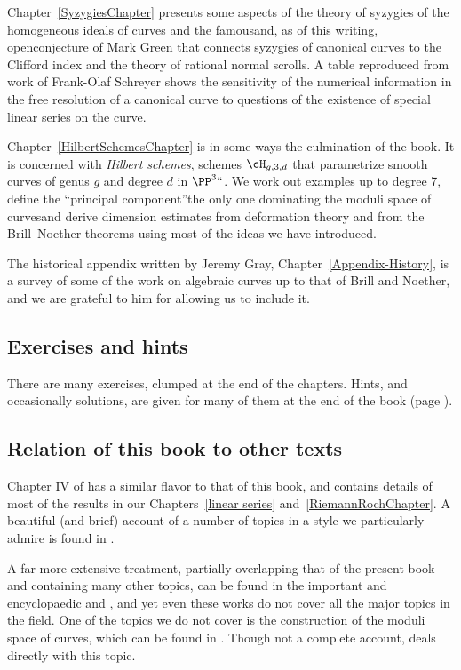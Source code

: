 Chapter~\ref{SyzygiesChapter} presents some aspects of the theory of syzygies of the homogeneous ideals of curves and the famous\emdash and, as of this writing, open\emdash conjecture of Mark Green that connects syzygies of canonical curves to the Clifford index and the theory of rational normal scrolls. A table reproduced from work of Frank-Olaf Schreyer shows the sensitivity of the numerical information in the free resolution of a canonical curve to questions of the existence of special linear series on the curve.

Chapter~\ref{HilbertSchemesChapter} is in some ways the culmination of
the book. It is concerned with \emph{Hilbert schemes}, schemes
$\cH_{g,3,d}$ that parametrize smooth curves of genus $g$ and degree
$d$  in $\PP^3` `$. We work out examples up to degree 7, define the
``principal component''\emdash the only one dominating the moduli
space of curves\emdash and derive dimension estimates from deformation
theory and from the Brill--Noether theorems
using most of the ideas we have introduced. 

The historical appendix written by Jeremy Gray, Chapter~\ref{Appendix-History},  is a survey of some of the work on
algebraic curves up to that of Brill and Noether, and we are grateful to him for allowing us to include it.

\subsection*{Exercises and hints}

There are many exercises, clumped at the end of the chapters. Hints,
and occasionally solutions, are given for many of them at the end of
the book (page \pageref{hints}).

\subsection*{Relation of this book to other texts} 
Chapter IV of \cite{Hartshorne1977} has a similar flavor to that of this book, and contains details of most of the 
results in our Chapters~\ref{linear series} and~\ref{RiemannRochChapter}. A beautiful (and brief) account of a number of topics in a style we particularly admire is found in \cite{MumfordCJ}.

A far more extensive treatment, partially overlapping that of the present book and containing many other topics, can be found in the important and encyclopaedic \cite{ACGH} and \cite{ACG}, and yet even these works do not cover all the major topics in the field. 
One of the topics we do not cover is the construction of the moduli space of curves, which can be found
in \cite{ACG}. Though not a complete account, \cite{HarrisMorrison1998} deals directly with this
topic. 

